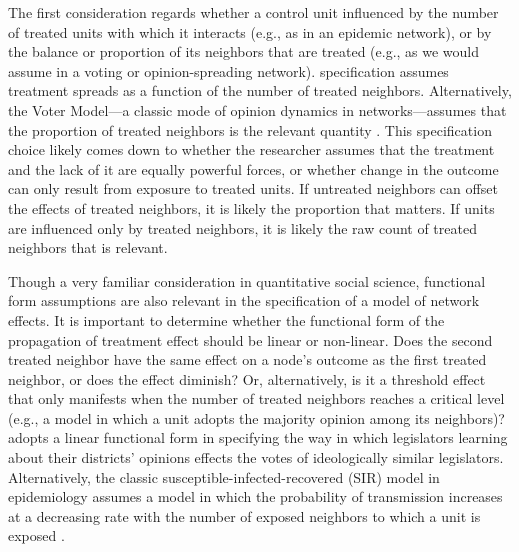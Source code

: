 \documentclass[12pt]{article}
\begin{document}
The first consideration regards whether a control unit influenced by the number of treated units with which it interacts (e.g., as in an epidemic network), or by the balance or proportion of its neighbors that are treated (e.g., as we would assume in a voting or opinion-spreading network). \citet{bowers2012reasoning} specification assumes treatment spreads as a function of the number of treated neighbors. Alternatively, the Voter Model---a classic mode of opinion dynamics in networks---assumes that the proportion of treated neighbors is the relevant quantity \citep{valentini2014self}. This specification choice likely comes down to whether the researcher assumes that the treatment and the lack of it are equally powerful forces, or whether change in the outcome can only result from exposure to treated units. If untreated neighbors can offset the effects of treated neighbors, it is likely the proportion that matters. If units are influenced only by treated neighbors, it is likely the raw count of treated neighbors that is relevant. 

Though a very familiar consideration in quantitative social science, functional form assumptions are also relevant in the specification of a model of network effects. It is important to determine whether the functional form of the propagation of treatment effect should be linear or non-linear. Does the second treated neighbor have the same effect on a node's outcome as the first treated neighbor, or does the effect diminish? Or, alternatively, is it a threshold effect that only manifests when the number of treated neighbors reaches a critical level (e.g., a model in which a unit adopts the majority opinion among its neighbors)? \citet{coppock2014information} adopts a linear functional form in specifying the way in which legislators learning about their districts' opinions effects the votes of ideologically similar legislators. Alternatively, the classic susceptible-infected-recovered (SIR) model in epidemiology assumes a model in which the probability of transmission increases at a decreasing rate with the number of exposed neighbors to which a unit is exposed \citep{dodds2004universal}.


\end{document}
